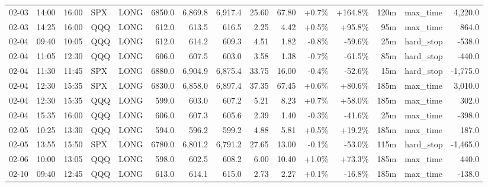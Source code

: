 \documentclass[11pt,a4paper,twoside]{article}
\begin{document}
\begin{landscape}
\begin{center}
\begin{longtable}{>{\color{txtmain}}l l l l l r r r r r r r r >{\color{txtmain}}l r}
02-03 & 14:00 & 16:00 & SPX & LONG & 6850.0 & 6,869.8 & 6,917.4 & 25.60 & 67.80 & \textcolor{wingreen}{+0.7\%} & \textcolor{wingreen}{+164.8\%} & 120m & max\_time & \textcolor{wingreen}{4,220.0} \\
02-03 & 14:25 & 16:00 & QQQ & LONG & 612.0 & 613.5 & 616.5 & 2.25 & 4.42 & \textcolor{wingreen}{+0.5\%} & \textcolor{wingreen}{+95.8\%} & 95m & max\_time & \textcolor{wingreen}{864.0} \\
02-04 & 09:40 & 10:05 & QQQ & LONG & 612.0 & 614.2 & 609.3 & 4.51 & 1.82 & \textcolor{lossred}{-0.8\%} & \textcolor{lossred}{-59.6\%} & 25m & hard\_stop & \textcolor{lossred}{-538.0} \\
02-04 & 11:05 & 12:30 & QQQ & LONG & 606.0 & 607.5 & 603.0 & 3.58 & 1.38 & \textcolor{lossred}{-0.7\%} & \textcolor{lossred}{-61.5\%} & 85m & hard\_stop & \textcolor{lossred}{-440.0} \\
02-04 & 11:30 & 11:45 & SPX & LONG & 6880.0 & 6,904.9 & 6,875.4 & 33.75 & 16.00 & \textcolor{lossred}{-0.4\%} & \textcolor{lossred}{-52.6\%} & 15m & hard\_stop & \textcolor{lossred}{-1,775.0} \\
02-04 & 12:30 & 15:35 & SPX & LONG & 6830.0 & 6,858.0 & 6,897.4 & 37.35 & 67.45 & \textcolor{wingreen}{+0.6\%} & \textcolor{wingreen}{+80.6\%} & 185m & max\_time & \textcolor{wingreen}{3,010.0} \\
02-04 & 12:30 & 15:35 & QQQ & LONG & 599.0 & 603.0 & 607.2 & 5.21 & 8.23 & \textcolor{wingreen}{+0.7\%} & \textcolor{wingreen}{+58.0\%} & 185m & max\_time & \textcolor{wingreen}{302.0} \\
02-04 & 15:35 & 16:00 & QQQ & LONG & 606.0 & 607.3 & 605.6 & 2.39 & 1.40 & \textcolor{lossred}{-0.3\%} & \textcolor{lossred}{-41.6\%} & 25m & max\_time & \textcolor{lossred}{-398.0} \\
02-05 & 10:25 & 13:30 & QQQ & LONG & 594.0 & 596.2 & 599.2 & 4.88 & 5.81 & \textcolor{wingreen}{+0.5\%} & \textcolor{wingreen}{+19.2\%} & 185m & max\_time & \textcolor{wingreen}{187.0} \\
02-05 & 13:55 & 15:50 & SPX & LONG & 6780.0 & 6,801.2 & 6,791.2 & 27.65 & 13.00 & \textcolor{lossred}{-0.1\%} & \textcolor{lossred}{-53.0\%} & 115m & hard\_stop & \textcolor{lossred}{-1,465.0} \\
02-06 & 10:00 & 13:05 & QQQ & LONG & 598.0 & 602.5 & 608.2 & 6.00 & 10.40 & \textcolor{wingreen}{+1.0\%} & \textcolor{wingreen}{+73.3\%} & 185m & max\_time & \textcolor{wingreen}{440.0} \\
02-10 & 09:40 & 12:45 & QQQ & LONG & 613.0 & 614.1 & 615.0 & 2.73 & 2.27 & \textcolor{wingreen}{+0.1\%} & \textcolor{lossred}{-16.8\%} & 185m & max\_time & \textcolor{lossred}{-138.0} \\

\end{longtable}
\end{center}
\end{landscape}
\end{document}
